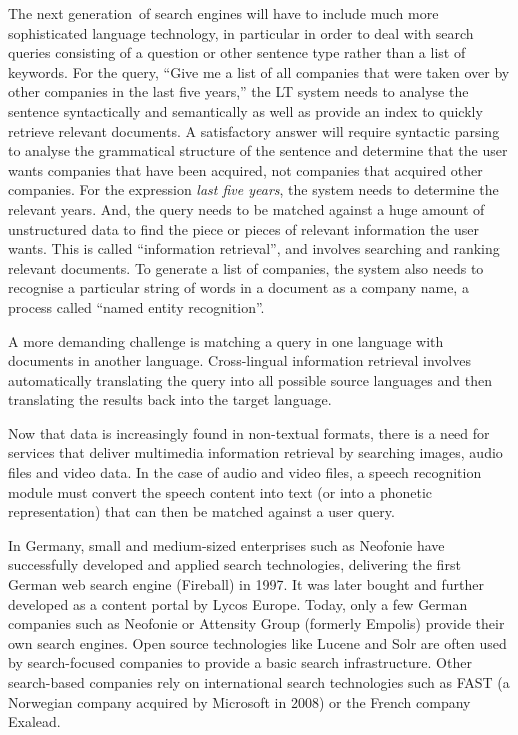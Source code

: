 \documentclass[]{../../metanetpaper}
\begin{document}
\begin{Parallel}[c]{80mm}{80mm}
{The next generation\ of search engines will have to include much more sophisticated language technology, in particular in order to 
deal 
with search queries consisting of a question or other sentence type rather than a list of keywords. For the query, “Give me a list of 
all companies that were taken over by other companies in the last five years,” the LT system needs to analyse the sentence 
syntactically and semantically as well as provide an index to quickly retrieve relevant documents. A satisfactory answer will require 
syntactic parsing to analyse the grammatical structure of the sentence and determine that the user wants companies that have been 
acquired, not companies that acquired other companies. For the expression \textit{last five years}, the system needs to determine the 
relevant years. And, the query needs to be matched against a huge amount of unstructured data to find the piece or pieces of relevant 
information the user wants. This is called “information retrieval”, and involves searching and ranking relevant documents. To generate 
a list of companies, the system also needs to recognise a particular string of words in a document as a company name, a process called 
“named entity recognition”.

A more demanding challenge is matching a query in one language with documents in another language. Cross-lingual information retrieval 
involves automatically translating the query into all possible source languages and then translating the results back into the target 
language. 

Now that data is increasingly found in non-textual formats, there is a need for services that deliver multimedia information retrieval 
by searching images, audio files and video data. In the case of audio and video files, a speech recognition module must convert the 
speech content into text (or into a phonetic representation) that can then be matched against a user query.

In Germany, small and medium-sized enterprises such as Neofonie have successfully developed and applied search technologies, delivering the first German web search engine (Fireball) in 1997. It was later bought and further developed as a content portal by Lycos Europe. Today, only a few German companies such as Neofonie or Attensity Group (formerly Empolis) provide their own search engines. Open source technologies like Lucene and Solr are often used by search-focused companies to provide a basic search infrastructure. Other search-based companies rely on international search technologies such as FAST (a Norwegian company acquired by Microsoft in 2008) or the French company Exalead.

}
\end{Parallel}
\end{document}
